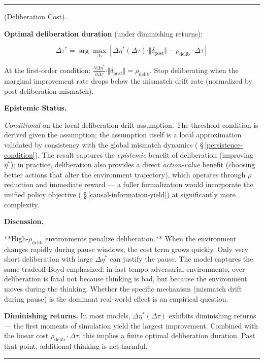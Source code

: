 \documentclass[11pt,oneside]{article}
\newcounter{claim}[section]
\renewcommand{\theclaim}{\thesection.\arabic{claim}}
\newenvironment{segment}[2]{%
  \refstepcounter{claim}%
  \bigskip\noindent\hrule\smallskip
  \noindent{\bfseries #1~\theclaim}\enskip(#2).\par\smallskip
  \noindent\ignorespaces
}{%
  \par\smallskip\noindent\hrule\bigskip
}
\newenvironment{proposition}[1][]{\begin{segment}{Proposition}{#1}}{\end{segment}}
\begin{document}
\begin{proposition}[Deliberation Cost]
\textbf{Optimal deliberation duration} (under diminishing returns):


$$\Delta\tau^* = \arg\max_{\Delta\tau} \left[\Delta\eta^*(\Delta\tau) \cdot \Vert\delta_{\text{post}}\Vert - \rho_{\text{delib}} \cdot \Delta\tau \right]$$

At the first-order condition: $\frac{\partial \Delta\eta^*}{\partial \Delta\tau} \cdot \Vert\delta_{\text{post}}\Vert = \rho_{\text{delib}}$. Stop deliberating when the marginal improvement rate drops below the mismatch drift rate (normalized by post-deliberation mismatch).


\medskip\noindent\textbf{Epistemic Status.}


\textit{Conditional} on the local deliberation-drift assumption. The threshold condition is derived given the assumption; the assumption itself is a local approximation validated by consistency with the global mismatch dynamics ( \S\,\ref{persistence-condition}). The result captures the \textit{epistemic} benefit of deliberation (improving $\eta^*$); in practice, deliberation also provides a direct \textit{action-value} benefit (choosing better actions that alter the environment trajectory), which operates through $\rho$ reduction and immediate reward — a fuller formalization would incorporate the unified policy objective ( \S\,\ref{causal-information-yield}) at significantly more complexity.


\medskip\noindent\textbf{Discussion.}


**High-$\rho_{\text{delib}}$ environments penalize deliberation.** When the environment changes rapidly during pause windows, the cost term grows quickly. Only very short deliberation with large $\Delta\eta^*$ can justify the pause. The model captures the same tradeoff Boyd emphasized: in fast-tempo adversarial environments, over-deliberation is fatal not because thinking is bad, but because the environment moves during the thinking. Whether the specific mechanism (mismatch drift during pause) is the dominant real-world effect is an empirical question.

\textbf{Diminishing returns.} In most models, $\Delta\eta^*(\Delta\tau)$ exhibits diminishing returns — the first moments of simulation yield the largest improvement. Combined with the linear cost $\rho_{\text{delib}} \cdot \Delta\tau$, this implies a finite optimal deliberation duration. Past that point, additional thinking is net-harmful.


\end{proposition}
\end{document}
